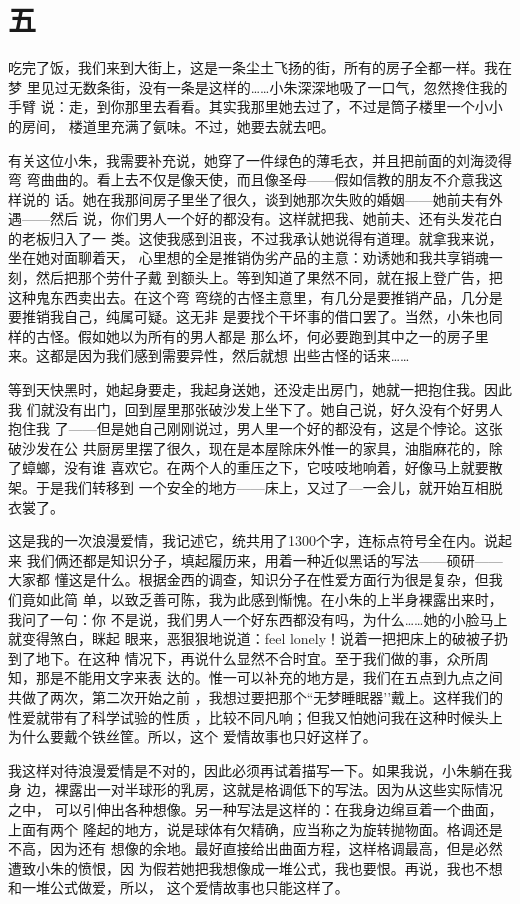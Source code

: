 \section{五}

吃完了饭，我们来到大街上，这是一条尘土飞扬的街，所有的房子全都一样。我在梦
里见过无数条街，没有一条是这样的……小朱深深地吸了一口气，忽然搀住我的手臂
说：走，到你那里去看看。其实我那里她去过了，不过是筒子楼里一个小小的房间，
楼道里充满了氨味。不过，她要去就去吧。

有关这位小朱，我需要补充说，她穿了一件绿色的薄毛衣，并且把前面的刘海烫得弯
弯曲曲的。看上去不仅是像天使，而且像圣母——假如信教的朋友不介意我这样说的
话。她在我那间房子里坐了很久，谈到她那次失败的婚姻——她前夫有外遇——然后
说，你们男人一个好的都没有。这样就把我、她前夫、还有头发花白的老板归入了一
类。这使我感到沮丧，不过我承认她说得有道理。就拿我来说，坐在她对面聊着天，
心里想的全是推销伪劣产品的主意：劝诱她和我共享销魂一刻，然后把那个劳什子戴
到额头上。等到知道了果然不同，就在报上登广告，把这种鬼东西卖出去。在这个弯
弯绕的古怪主意里，有几分是要推销产品，几分是要推销我自己，纯属可疑。这无非
是要找个干坏事的借口罢了。当然，小朱也同样的古怪。假如她以为所有的男人都是
那么坏，何必要跑到其中之一的房子里来。这都是因为我们感到需要异性，然后就想
出些古怪的话来……

等到天快黑时，她起身要走，我起身送她，还没走出房门，她就一把抱住我。因此我
们就没有出门，回到屋里那张破沙发上坐下了。她自己说，好久没有个好男人抱住我
了——但是她自己刚刚说过，男人里一个好的都没有，这是个悖论。这张破沙发在公
共厨房里摆了很久，现在是本屋除床外惟一的家具，油脂麻花的，除了蟑螂，没有谁
喜欢它。在两个人的重压之下，它吱吱地响着，好像马上就要散架。于是我们转移到
一个安全的地方——床上，又过了—一会儿，就开始互相脱衣裳了。

这是我的一次浪漫爱情，我记述它，统共用了1300个字，连标点符号全在内。说起来
我们俩还都是知识分子，填起履历来，用着一种近似黑话的写法——硕研——大家都
懂这是什么。根据金西的调查，知识分子在性爱方面行为很是复杂，但我们竟如此简
单，以致乏善可陈，我为此感到惭愧。在小朱的上半身裸露出来时，我问了一句：你
不是说，我们男人一个好东西都没有吗，为什么……她的小脸马上就变得煞白，眯起
眼来，恶狠狠地说道：feel lonely！说着一把把床上的破被子扔到了地下。在这种
情况下，再说什么显然不合时宜。至于我们做的事，众所周知，那是不能用文字来表
达的。惟一可以补充的地方是，我们在五点到九点之间共做了两次，第二次开始之前
，我想过要把那个“无梦睡眠器’’戴上。这样我们的性爱就带有了科学试验的性质
，比较不同凡响；但我又怕她问我在这种时候头上为什么要戴个铁丝筐。所以，这个
爱情故事也只好这样了。

我这样对待浪漫爱情是不对的，因此必须再试着描写一下。如果我说，小朱躺在我身
边，裸露出一对半球形的乳房，这就是格调低下的写法。因为从这些实际情况之中，
可以引伸出各种想像。另一种写法是这样的：在我身边绵亘着一个曲面，上面有两个
隆起的地方，说是球体有欠精确，应当称之为旋转抛物面。格调还是不高，因为还有
想像的余地。最好直接给出曲面方程，这样格调最高，但是必然遭致小朱的愤恨，因
为假若她把我想像成一堆公式，我也要恨。再说，我也不想和一堆公式做爱，所以，
这个爱情故事也只能这样了。

